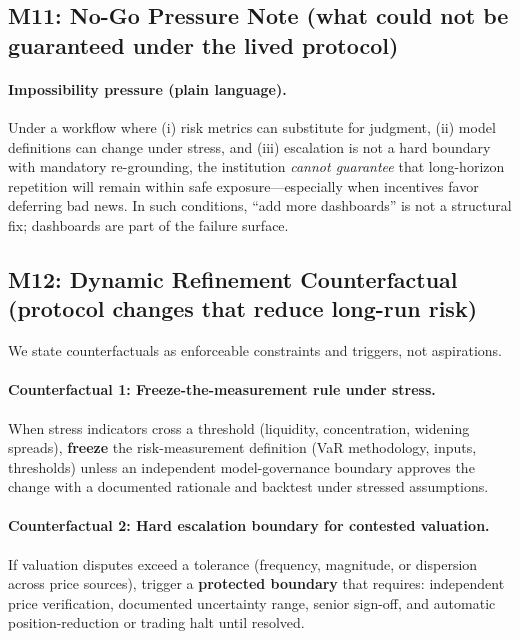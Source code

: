 \subsection{M11: No-Go Pressure Note (what could not be guaranteed under the lived protocol)}
\label{subsec:lw-m11}

\paragraph{Impossibility pressure (plain language).}
Under a workflow where (i) risk metrics can substitute for judgment, (ii) model definitions can change under stress, and (iii) escalation is not a hard boundary with mandatory re-grounding, the institution \emph{cannot guarantee} that long-horizon repetition will remain within safe exposure—especially when incentives favor deferring bad news. In such conditions, “add more dashboards” is not a structural fix; dashboards are part of the failure surface.

\subsection{M12: Dynamic Refinement Counterfactual (protocol changes that reduce long-run risk)}
\label{subsec:lw-m12}

We state counterfactuals as enforceable constraints and triggers, not aspirations.

\paragraph{Counterfactual 1: Freeze-the-measurement rule under stress.}
When stress indicators cross a threshold (liquidity, concentration, widening spreads), \textbf{freeze} the risk-measurement definition (VaR methodology, inputs, thresholds) unless an independent model-governance boundary approves the change with a documented rationale and backtest under stressed assumptions.

\paragraph{Counterfactual 2: Hard escalation boundary for contested valuation.}
If valuation disputes exceed a tolerance (frequency, magnitude, or dispersion across price sources), trigger a \textbf{protected boundary} that requires: independent price verification, documented uncertainty range, senior sign-off, and automatic position-reduction or trading halt until resolved.


